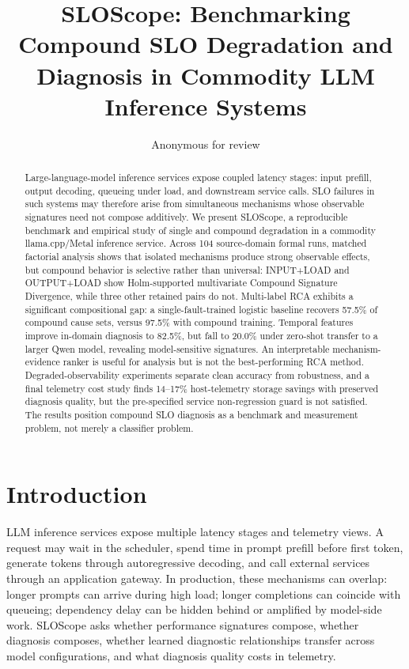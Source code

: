 \documentclass[11pt]{article}
\title{SLOScope: Benchmarking Compound SLO Degradation and Diagnosis in Commodity LLM Inference Systems}
\author{Anonymous for review}
\date{}
\begin{document}
\maketitle
\begin{abstract}
Large-language-model inference services expose coupled latency stages: input prefill, output decoding, queueing under load, and downstream service calls. SLO failures in such systems may therefore arise from simultaneous mechanisms whose observable signatures need not compose additively. We present SLOScope, a reproducible benchmark and empirical study of single and compound degradation in a commodity llama.cpp/Metal inference service. Across 104 source-domain formal runs, matched factorial analysis shows that isolated mechanisms produce strong observable effects, but compound behavior is selective rather than universal: INPUT+LOAD and OUTPUT+LOAD show Holm-supported multivariate Compound Signature Divergence, while three other retained pairs do not. Multi-label RCA exhibits a significant compositional gap: a single-fault-trained logistic baseline recovers 57.5\% of compound cause sets, versus 97.5\% with compound training. Temporal features improve in-domain diagnosis to 82.5\%, but fall to 20.0\% under zero-shot transfer to a larger Qwen model, revealing model-sensitive signatures. An interpretable mechanism-evidence ranker is useful for analysis but is not the best-performing RCA method. Degraded-observability experiments separate clean accuracy from robustness, and a final telemetry cost study finds 14--17\% host-telemetry storage savings with preserved diagnosis quality, but the pre-specified service non-regression guard is not satisfied. The results position compound SLO diagnosis as a benchmark and measurement problem, not merely a classifier problem.
\end{abstract}

\section{Introduction}
LLM inference services expose multiple latency stages and telemetry views. A request may wait in the scheduler, spend time in prompt prefill before first token, generate tokens through autoregressive decoding, and call external services through an application gateway. In production, these mechanisms can overlap: longer prompts can arrive during high load; longer completions can coincide with queueing; dependency delay can be hidden behind or amplified by model-side work. SLOScope asks whether performance signatures compose, whether diagnosis composes, whether learned diagnostic relationships transfer across model configurations, and what diagnosis quality costs in telemetry.
\end{document}
